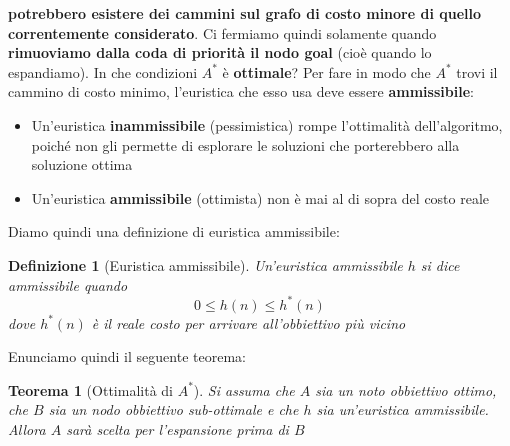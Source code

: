 \documentclass[12pt]{article}
\newtheorem{Definizione}{Definizione}[subsection]
\newtheorem{Teorema}{Teorema}[subsection]
\begin{document}
\textbf{potrebbero esistere dei cammini sul grafo di costo minore di quello correntemente considerato}.
Ci fermiamo quindi solamente quando \textbf{rimuoviamo dalla coda di priorità il nodo goal} (cioè quando lo espandiamo).
In che condizioni $A^*$ è \textbf{ottimale}? Per fare in modo che $A^*$ trovi il cammino di costo minimo, l'euristica che esso usa
deve essere \textbf{ammissibile}:
\begin{itemize}
    \item Un'euristica \textbf{inammissibile} (pessimistica) rompe l'ottimalità dell'algoritmo, poiché non gli permette di esplorare le soluzioni che porterebbero alla soluzione ottima
    \item Un'euristica \textbf{ammissibile} (ottimista) non è mai al di sopra del costo reale
\end{itemize}
Diamo quindi una definizione di euristica ammissibile:
\begin{Definizione}[Euristica ammissibile]
    Un'euristica ammissibile $h$ si dice ammissibile quando
    $$0 \leq h(n) \leq h^*(n)$$
    dove $h^*(n)$ è il reale costo per arrivare all'obbiettivo più vicino
\end{Definizione}
Enunciamo quindi il seguente teorema:
\begin{Teorema} [Ottimalità di $A^*$]
    Si assuma che $A$ sia un noto obbiettivo ottimo, che $B$ sia un nodo obbiettivo sub-ottimale e che $h$ sia un'euristica ammissibile.
    Allora $A$ sarà scelta per l'espansione prima di $B$
\end{Teorema}
\end{document}
